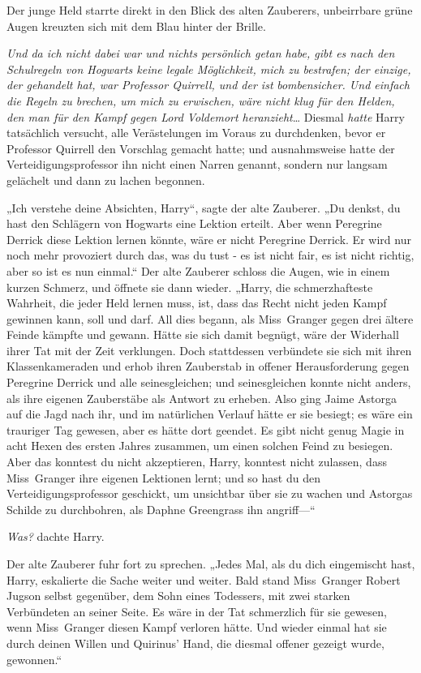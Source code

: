{Der junge Held starrte direkt in den Blick des alten Zauberers, unbeirrbare grüne Augen kreuzten sich mit dem Blau hinter der Brille.

\emph{Und da ich nicht dabei war und nichts persönlich getan habe, gibt es nach den Schulregeln von Hogwarts keine legale Möglichkeit, mich zu bestrafen; der einzige, der gehandelt hat, war Professor Quirrell, und der ist} \emph{bombensicher. Und einfach die Regeln zu brechen, um mich zu erwischen, wäre nicht klug für den Helden, den man für den Kampf gegen Lord Voldemort heranzieht}… Diesmal \emph{hatte} Harry tatsächlich versucht, alle Verästelungen im Voraus zu durchdenken, bevor er Professor Quirrell den Vorschlag gemacht hatte; und ausnahmsweise hatte der Verteidigungsprofessor ihn nicht einen Narren genannt, sondern nur langsam gelächelt und dann zu lachen begonnen.

„Ich verstehe deine Absichten, Harry“, sagte der alte Zauberer. „Du denkst, du hast den Schlägern von Hogwarts eine Lektion erteilt. Aber wenn Peregrine Derrick diese Lektion lernen könnte, wäre er nicht Peregrine Derrick. Er wird nur noch mehr provoziert durch das, was du tust - es ist nicht fair, es ist nicht richtig, aber so ist es nun einmal.“ Der alte Zauberer schloss die Augen, wie in einem kurzen Schmerz, und öffnete sie dann wieder. „Harry, die schmerzhafteste Wahrheit, die jeder Held lernen muss, ist, dass das Recht nicht jeden Kampf gewinnen kann, soll und darf. All dies begann, als Miss~Granger gegen drei ältere Feinde kämpfte und gewann. Hätte sie sich damit begnügt, wäre der Widerhall ihrer Tat mit der Zeit verklungen. Doch stattdessen verbündete sie sich mit ihren Klassenkameraden und erhob ihren Zauberstab in offener Herausforderung gegen Peregrine Derrick und alle seinesgleichen; und seinesgleichen konnte nicht anders, als ihre eigenen Zauberstäbe als Antwort zu erheben. Also ging Jaime Astorga auf die Jagd nach ihr, und im natürlichen Verlauf hätte er sie besiegt; es wäre ein trauriger Tag gewesen, aber es hätte dort geendet. Es gibt nicht genug Magie in acht Hexen des ersten Jahres zusammen, um einen solchen Feind zu besiegen. Aber das konntest du nicht akzeptieren, Harry, konntest nicht zulassen, dass Miss~Granger ihre eigenen Lektionen lernt; und so hast du den Verteidigungsprofessor geschickt, um unsichtbar über sie zu wachen und Astorgas Schilde zu durchbohren, als Daphne Greengrass ihn angriff—“

\emph{Was?} dachte Harry.

Der alte Zauberer fuhr fort zu sprechen. „Jedes Mal, als du dich eingemischt hast, Harry, eskalierte die Sache weiter und weiter. Bald stand Miss~Granger Robert Jugson selbst gegenüber, dem Sohn eines Todessers, mit zwei starken Verbündeten an seiner Seite. Es wäre in der Tat schmerzlich für sie gewesen, wenn Miss~Granger diesen Kampf verloren hätte. Und wieder einmal hat sie durch deinen Willen und Quirinus' Hand, die diesmal offener gezeigt wurde, gewonnen.“

}
